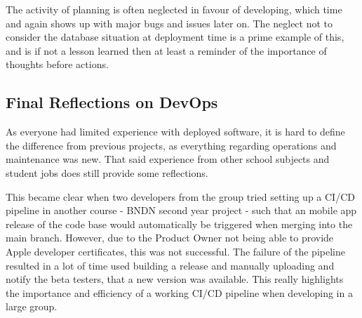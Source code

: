 \documentclass[report/main.tex]{subfiles}
\begin{document}
            The activity of planning is often neglected in favour of developing, which time and again shows up with major bugs and issues later on. The neglect not to consider the database situation at deployment time is a prime example of this, and is if not a lesson learned then at least a reminder of the importance of thoughts before actions.
        
        \subsection{Final Reflections on DevOps}
        \label{subsec:final-reflections-on-devops}
            As everyone had limited experience with deployed software, it is hard to define the difference from previous projects, as everything regarding operations and maintenance was new. That said experience from other school subjects and student jobs does still provide some reflections.
            
            
            This became clear when two developers from the group tried setting up a CI/CD pipeline in another course - BNDN second year project - such that an mobile app release of the code base would automatically be triggered when merging into the main branch. However, due to the Product Owner not being able to provide Apple developer certificates, this was not successful. The failure of the pipeline resulted in a lot of time used building a release and manually uploading and notify the beta testers, that a new version was available. This really highlights the importance and efficiency of a working CI/CD pipeline when developing in a large group. 
            
\end{document}
